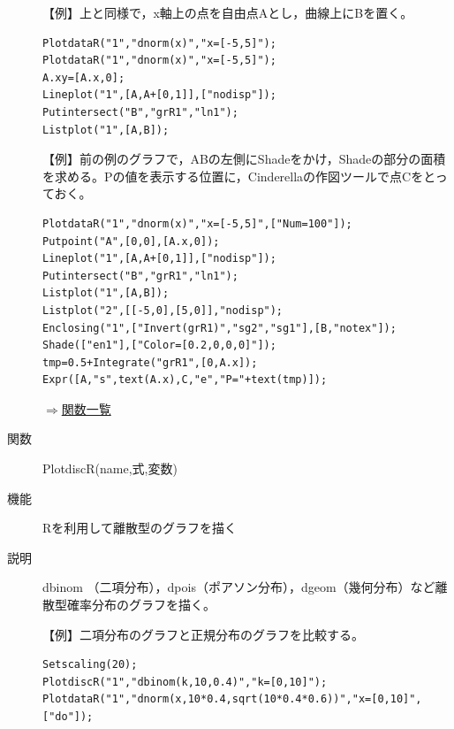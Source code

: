 \documentclass[papersize,a4paper,12pt,uplatex]{jsarticle}
\begin{document}
\begin{description}
\vspace{\baselineskip}
【例】上と同様で，x軸上の点を自由点Aとし，曲線上にBを置く。
\begin{verbatim}
PlotdataR("1","dnorm(x)","x=[-5,5]");
PlotdataR("1","dnorm(x)","x=[-5,5]");
A.xy=[A.x,0];
Lineplot("1",[A,A+[0,1]],["nodisp"]);
Putintersect("B","grR1","ln1");
Listplot("1",[A,B]);
\end{verbatim}
\vspace{\baselineskip}
【例】前の例のグラフで，ABの左側にShadeをかけ，Shadeの部分の面積を求める。Pの値を表示する位置に，Cinderellaの作図ツールで点Cをとっておく。
\begin{verbatim}
PlotdataR("1","dnorm(x)","x=[-5,5]",["Num=100"]);
Putpoint("A",[0,0],[A.x,0]);
Lineplot("1",[A,A+[0,1]],["nodisp"]);
Putintersect("B","grR1","ln1");
Listplot("1",[A,B]);
Listplot("2",[[-5,0],[5,0]],"nodisp");
Enclosing("1",["Invert(grR1)","sg2","sg1"],[B,"notex"]);
Shade(["en1"],["Color=[0.2,0,0,0]"]);
tmp=0.5+Integrate("grR1",[0,A.x]);
Expr([A,"s",text(A.x),C,"e","P="+text(tmp)]);
\end{verbatim}

\begin{center}  \end{center}

\vspace{\baselineskip}
\begin{flushright}\hyperlink{functionlist}{$\Rightarrow$関数一覧}\end{flushright}

\vspace{\baselineskip}
\hypertarget{plotdiscr}{}
\item[関数]PlotdiscR(name,式,変数)
\item[機能]Rを利用して離散型のグラフを描く
\item[説明]dbinom （二項分布），dpois（ポアソン分布），dgeom（幾何分布）など離散型確率分布のグラフを描く。

\vspace{\baselineskip}
【例】二項分布のグラフと正規分布のグラフを比較する。
\begin{verbatim}
Setscaling(20);
PlotdiscR("1","dbinom(k,10,0.4)","k=[0,10]");
PlotdataR("1","dnorm(x,10*0.4,sqrt(10*0.4*0.6))","x=[0,10]",["do"]);
\end{verbatim}
\vspace{\baselineskip}
\begin{center} \scalebox{0.9}{} \end{center}


\end{description}
\end{document}
